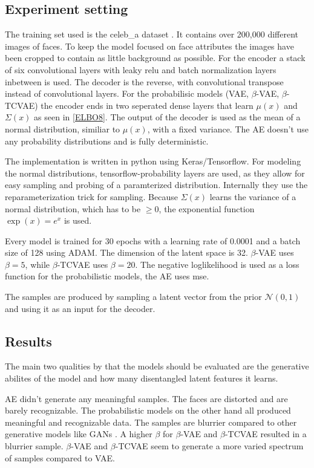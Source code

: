 \documentclass[a4paper]{IEEEtran}
\begin{document}
\subsection{Experiment setting}
The training set used is the celeb\_a dataset \cite{liu2015faceattributes}. It contains over 200,000 different images of faces. To keep the model focused on face attributes the images have been cropped to contain as little background as possible. For the encoder a stack of six convolutional layers with leaky relu and batch normalization layers inbetween is used. The decoder is the reverse, with convolutional transpose instead of convolutional layers. For the probabilisic models (VAE, $\beta$-VAE, $\beta$-TCVAE) the encoder ends in two seperated dense layers that learn $\mu(x)$ and $\Sigma(x)$ as seen in \eqref{ELBO8}. The output of the decoder is used as the mean of a normal distribution, similiar to $\mu(x)$, with a fixed variance. The AE doesn't use any probability distributions and is fully deterministic.

The implementation is written in python using Keras/Tensorflow. For modeling the normal distributions, tensorflow-probability layers are used, as they allow for easy sampling and probing of a paramterized distribution. Internally they use the reparameterization trick for sampling. Because $\Sigma(x)$ learns the variance of a normal distribution, which has to be $\geq 0$, the exponential function $\exp(x) = e^x$ is used.

Every model is trained for 30 epochs with a learning rate of 0.0001 and a batch size of 128 using ADAM\cite{DBLP:journals/corr/KingmaB14}. The dimension of the latent space is 32. $\beta$-VAE uses $\beta = 5$, while $\beta$-TCVAE uses $\beta = 20$. The negative loglikelihood is used as a loss function for the probabilistic models, the AE uses mse.

The samples are produced by sampling a latent vector from the prior $\mathcal{N}(0,1)$ and using it as an input for the decoder.


\subsection{Results}
The main two qualities by that the models should be evaluated are the generative abilites of the model and how many disentangled latent features it learns.

AE didn't generate any meaningful samples. The faces are distorted and are barely recognizable. The probabilistic models on the other hand all produced meaningful and recognizable data. The samples are blurrier compared to other generative models like GANs \cite{goodfellow2014generative}. A higher $\beta$ for $\beta$-VAE and $\beta$-TCVAE resulted in a blurrier sample. $\beta$-VAE and $\beta$-TCVAE seem to generate a more varied spectrum of samples compared to VAE.
\end{document}
